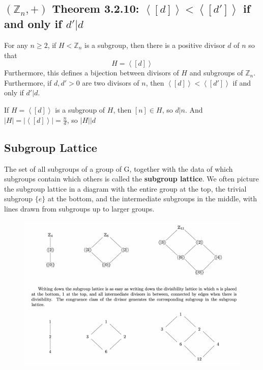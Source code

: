 \documentclass[11pt]{elegantbook}
\begin{document}
\subsection{$(\mathbb{Z}_n,+)$ Theorem 3.2.10: $\left\langle [d]\right\rangle<\left\langle [d']\right\rangle$ if and only if $d'|d$}
\begin{theorem}[Theorem 3.2.10]
For any $n \geq 2$, if $H <\mathbb{Z}_n$ is a subgroup, then there is a positive divisor $d$ of $n$ so that $$H=\left\langle [d]\right\rangle$$
Furthermore, this deﬁnes a bijection between divisors of $H$ and subgroups of $\mathbb{Z}_n$. Furthermore, if $d, d'> 0$ are two divisors of $n$, then $\left\langle [d]\right\rangle<\left\langle [d']\right\rangle$ if and only if $d'|d$.
\end{theorem}
If $H=\left\langle [d]\right\rangle$ is a subgroup of $H$, then $[n]\in H$, so $d|n$. And $|H|=|\left\langle [d]\right\rangle|=\frac{n}{d}$, so $|H|\vert d$

\subsection{Subgroup Lattice}
The set of all subgroups of a group of G, together with the data of which subgroups contain which others is called the \textbf{subgroup lattice}. We often picture the subgroup lattice in a diagram with the entire group at the top, the trivial subgroup $\{ e \} $ at the bottom, and the intermediate subgroups in the middle, with lines drawn from subgroups up to larger groups.
\begin{center}\begin{figure}[htbp]
    \centering
    \includegraphics[scale=0.4]{lec1301.png}
    \caption{}
    \label{}
\end{figure}\end{center}
\end{document}
